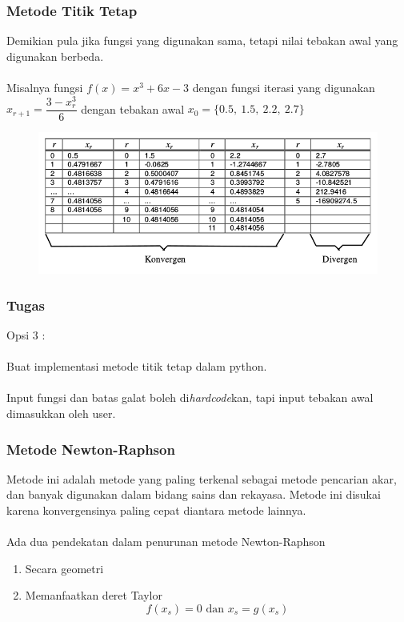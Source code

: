 \documentclass{beamer}
\begin{document}
\begin{frame}
\frametitle{Metode Titik Tetap}
Demikian pula jika fungsi yang digunakan sama, tetapi nilai tebakan awal yang digunakan berbeda.
\\\ \\Misalnya fungsi $f(x) = x^3+6x-3$ dengan fungsi iterasi yang digunakan $x_{r+1}= \dfrac{3-x_{r}^3}{6}$ dengan tebakan awal $x_0= \{0.5,\ 1.5,\ 2.2,\ 2.7\}$
\begin{figure}[htp]
\centering
\includegraphics[scale=0.47]{TitikTetapmultix0.png}
\end{figure}\end{frame}


\begin{frame}
\frametitle{Tugas}
Opsi 3 :\\\ \\
Buat implementasi metode titik tetap dalam python. \\\ \\Input fungsi dan batas galat boleh di\textit{hardcode}kan, tapi input tebakan awal dimasukkan oleh user. 
\end{frame}


\begin{frame}
\frametitle{Metode Newton-Raphson}
Metode ini adalah metode yang paling terkenal sebagai metode pencarian akar, dan banyak digunakan dalam bidang sains dan rekayasa. Metode ini disukai karena konvergensinya paling cepat diantara metode lainnya.
\\\ \\Ada dua pendekatan dalam penurunan metode Newton-Raphson
\begin{enumerate}
\item Secara geometri
\item Memanfaatkan deret Taylor
\begin{equation}
f(x_s) = 0 \text{ dan } x_{s} = g(x_s)
\nonumber
\end{equation}
\end{enumerate}
\end{frame}
\end{document}
